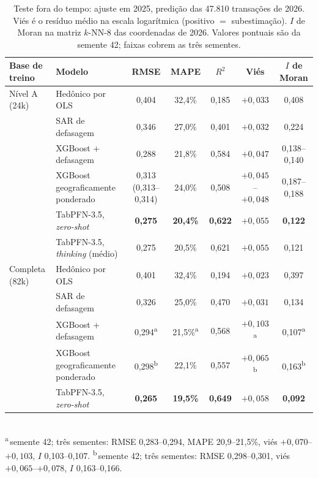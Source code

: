 \documentclass[11pt,a4paper]{article}
\begin{document}
\begin{table}[h]
\centering\small
\caption{Teste fora do tempo: ajuste em 2025, predição das 47.810 transações de 2026. Viés é o
resíduo médio na escala logarítmica (positivo $=$ subestimação). $I$ de Moran na matriz
$k$-NN-8 das coordenadas de 2026. Valores pontuais são da semente 42; faixas cobrem as três
sementes.}
\label{tab:oot}
\scriptsize\setlength{\tabcolsep}{2.6pt}
\begin{tabular}{llccccc}
\toprule
Base de treino & Modelo & RMSE & MAPE & $R^2$ & Viés & $I$ de Moran \\
\midrule
Nível A (24k) & Hedônico por OLS & 0,404 & 32,4\% & 0,185 & $+0{,}033$ & 0,408 \\
 & SAR de defasagem & 0,346 & 27,0\% & 0,401 & $+0{,}032$ & 0,224 \\
 & XGBoost + defasagem & 0,288 & 21,8\% & 0,584 & $+0{,}047$ & 0,138--0,140 \\
 & XGBoost geograficamente ponderado & 0,313 (0,313--0,314) & 24,0\% & 0,508 & $+0{,}045$--$+0{,}048$ & 0,187--0,188 \\
 & TabPFN-3.5, \emph{zero-shot} & \textbf{0,275} & \textbf{20,4\%} & \textbf{0,622} & $+0{,}055$ & \textbf{0,122} \\
 & TabPFN-3.5, \emph{thinking} (médio) & 0,275 & 20,5\% & 0,621 & $+0{,}055$ & 0,121 \\
\midrule
Completa (82k) & Hedônico por OLS & 0,401 & 32,4\% & 0,194 & $+0{,}023$ & 0,397 \\
 & SAR de defasagem & 0,326 & 25,0\% & 0,470 & $+0{,}031$ & 0,134 \\
  & XGBoost + defasagem & 0,294\textsuperscript{a} & 21,5\%\textsuperscript{a} & 0,568 & $+0{,}103$\textsuperscript{a} & 0,107\textsuperscript{a} \\
  & XGBoost geograficamente ponderado & 0,298\textsuperscript{b} & 22,1\% & 0,557 & $+0{,}065$\textsuperscript{b} & 0,163\textsuperscript{b} \\
 & TabPFN-3.5, \emph{zero-shot} & \textbf{0,265} & \textbf{19,5\%} & \textbf{0,649} & $+0{,}058$ & \textbf{0,092} \\
\bottomrule
\end{tabular}\\[2pt]
{\scriptsize \textsuperscript{a}\,semente 42; três sementes: RMSE 0,283--0,294, MAPE
20,9--21,5\%, viés $+0{,}070$--$+0{,}103$, $I$ 0,103--0,107.\quad
\textsuperscript{b}\,semente 42; três sementes: RMSE 0,298--0,301, viés $+0{,}065$--$+0{,}078$,
$I$ 0,163--0,166.}
\end{table}
\end{document}
